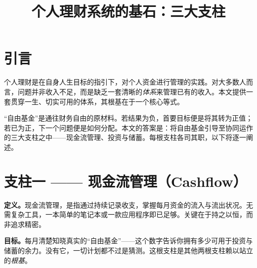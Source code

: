 \documentclass[11pt,a4paper,twocolumn]{article}
\title{\vspace{-1.5em}\bfseries\color{accent}\Large 个人理财系统的基石：三大支柱}
\author{}
\date{}
\begin{document}

\section{引言}
个人理财是在自身人生目标的指引下，对个人资金进行管理的实践。对大多数人而言，问题并非收入不足，而是缺乏一套清晰的\textit{体系}来管理已有的收入。本文提供一套贯穿一生、切实可用的体系，其根基在于一个核心等式。

\begin{center}
{\setlength{\fboxsep}{10pt}}
\end{center}

“自由基金”是通往财务自由的原材料。若结果为负，首要目标便是将其转为正值；若已为正，下一个问题便是如何分配。本文的答案是：将自由基金引导至协同运作的三大支柱之中——现金流管理、投资与储蓄。每根支柱各司其职，以下将逐一阐述。

\section{支柱一 —— 现金流管理（Cashflow）}
\textbf{定义。}现金流管理，是指通过持续记录收支，掌握每月资金的流入与流出状况。无需复杂工具，一本简单的笔记本或一款应用程序即已足够。关键在于持之以恒，而非追求精密。

\textbf{目标。}每月清楚知晓真实的“自由基金”——这个数字告诉你拥有多少可用于投资与储蓄的余力。没有它，一切计划都不过是猜测。这根支柱是其他两根支柱赖以站立的\textit{根基}。
\end{document}
